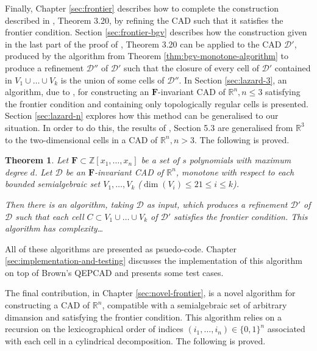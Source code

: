 \documentclass[
]{book}
\newtheorem{theorem}{Theorem}[chapter]
\theoremstyle{definition}
\theoremstyle{definition}
\theoremstyle{definition}
\theoremstyle{definition}
\theoremstyle{remark}
\begin{document}
Finally, Chapter \ref{sec:frontier} describes how to complete the construction described in \citet{bgv15}, Theorem 3.20, by refining the CAD such that it satisfies the frontier condition. Section \ref{sec:frontier-bgv} describes how the construction given in the last part of the proof of \citet{bgv15}, Theorem 3.20 can be applied to the CAD \(\mathcal{D'}\), produced by the algorithm from Theorem \ref{thm:bgv-monotone-algorithm} to produce a refinement \(\mathcal{D''}\) of \(\mathcal{D'}\) such that the closure of every cell of \(\mathcal{D'}\) contained in \(V_1\cup \ldots \cup V_k\) is the union of some cells of \(\mathcal{D''}\).
In Section \ref{sec:lazard-3}, an algorithm, due to \citet{lazard10}, for constructing an \(\mathbf{F}\)-invariant CAD of \(\mathbb{R}^n, n \le 3\) satisfying the frontier condition and containing only topologically regular cells is presented. Section \ref{sec:lazard-n} explores how this method can be generalised to our situation. In order to do this, the results of \citet{lazard10}, Section 5.3 are generalised from \(\mathbb{R}^3\) to the two-dimensional cells in a CAD of \(\mathbb{R}^n, n > 3\).
The following is proved.

\begin{theorem}
\protect\hypertarget{thm:lazard-rn}{}\label{thm:lazard-rn}Let \(\mathbf{F} \subset \mathbb{Z}[x_1,\ldots,x_n]\) be a set of \(s\) polynomials with maximum degree \(d\).
Let \(\mathcal{D}\) be an \(\mathbf{F}\)-invariant CAD of \(\mathbb{R}^n\), monotone with respect to each bounded semialgebraic set \(V_1,\ldots,V_k\) (\(\dim(V_i) \le 2 1\le i \le k\)).

Then there is an algorithm, taking \(\mathcal{D}\) as input, which produces a refinement \(\mathcal{D'}\) of \(\mathcal{D}\) such that each cell \(C \subset V_1\cup\ldots\cup V_k\) of \(\mathcal{D'}\) satisfies the frontier condition.
This algorithm has complexity\ldots{}
\end{theorem}

All of these algorithms are presented as psuedo-code. Chapter \ref{sec:implementation-and-testing} discusses the implementation of this algorithm on top of Brown's QEPCAD \citep{brownQepcad} and presents some test cases.

The final contribution, in Chapter \ref{sec:novel-frontier}, is a novel algorithm for constructing a CAD of \(\mathbb{R}^n\), compatible with a semialgebraic set of arbitrary dimansion and satisfying the frontier condition. This algorithm relies on a recursion on the lexicographical order of indices \((i_1,\ldots,i_n) \in \{ 0,1 \}^n\) associated with each cell in a cylindrical decomposition. The following is proved.
\end{document}
